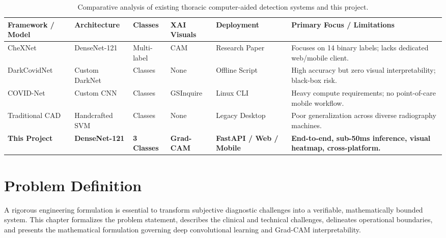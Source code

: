 \documentclass[12pt,a4paper]{report}
\begin{document}
\begin{table}[H]
\centering
\begin{singlespace}
\caption{Comparative analysis of existing thoracic computer-aided detection systems and this project.}
\label{tab:lit_comparison}
\footnotesize
\renewcommand{\arraystretch}{1.1}
\begin{tabularx}{\textwidth}{>{\raggedright\arraybackslash}p{2.4cm} >{\centering\arraybackslash}p{2.0cm} >{\centering\arraybackslash}p{1.3cm} >{\centering\arraybackslash}p{1.6cm} >{\centering\arraybackslash}p{2.0cm} >{\raggedright\arraybackslash}X}
\toprule
\textbf{Framework / Model} & \textbf{Architecture} & \textbf{Classes} & \textbf{XAI Visuals} & \textbf{Deployment} & \textbf{Primary Focus / Limitations} \\
\midrule
CheXNet \cite{ref_rajpurkar2017_chexnet} & DenseNet-121 & Multi-label & CAM & Research Paper & Focuses on 14 binary labels; lacks dedicated web/mobile client. \\
DarkCovidNet \cite{ref_ozturk2020_covid} & Custom DarkNet & 3 Classes & None & Offline Script & High accuracy but zero visual interpretability; black-box risk. \\
COVID-Net \cite{ref_apostolopoulos2020_covid} & Custom CNN & 3 Classes & GSInquire & Linux CLI & Heavy compute requirements; no point-of-care mobile workflow. \\
Traditional CAD & Handcrafted SVM & 2 Classes & None & Legacy Desktop & Poor generalization across diverse radiography machines. \\
\textbf{This Project} & \textbf{DenseNet-121} & \textbf{3 Classes} & \textbf{Grad-CAM} & \textbf{FastAPI / Web / Mobile} & \textbf{End-to-end, sub-50ms inference, visual heatmap, cross-platform.} \\
\bottomrule
\end{tabularx}
\end{singlespace}
\end{table}


\chapter{Problem Definition}

A rigorous engineering formulation is essential to transform subjective diagnostic challenges into a verifiable, mathematically bounded system. This chapter formalizes the problem statement, describes the clinical and technical challenges, delineates operational boundaries, and presents the mathematical formulation governing deep convolutional learning and Grad-CAM interpretability.
\end{document}
